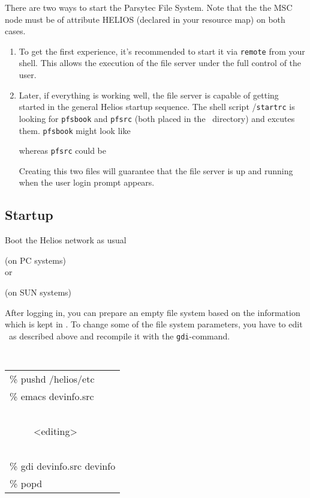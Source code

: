 \begin{note}
  There are two ways to start the Parsytec File System. Note that the the MSC
  node must be of attribute HELIOS (declared in your resource map) on both
  cases.

  \begin{enumerate}

    \item To get the first experience, it's recommended to start it via
          {\tt remote} from your shell. This allows the execution of the file
          server under the full control of the user.


    \item Later, if everything is working well, the file server is capable of
          getting started in the general Helios startup sequence. The shell
          script \HE\slash {\tt startrc} is looking for {\tt pfsbook} and
          {\tt pfsrc} (both placed in the \HE\ directory) and excutes them.
          {\tt pfsbook} might look like

          

          whereas {\tt pfsrc} could be

          

          Creating this two files will guarantee that the file server is up
          and running when the user login prompt appears.
  \end{enumerate}

\end{note}

\subsection{Startup}

Boot the Helios network as usual

 \hfill (on PC systems) \\

or

 \hfill (on SUN systems)

After logging in, you can prepare an empty file system based on the
information which is kept in \DI. To change some of the file system
parameters, you have to edit \DIS\ as described above and recompile it with
the {\tt gdi}-command.

{\tt
  \begin{tabular}{|l|}
    \hline
    \% pushd /helios/etc       \\
    \% emacs devinfo.src       \\
    \                          \\
    \ \ \ \ \ <editing>        \\
    \                          \\
    \% gdi devinfo.src devinfo \\
    \% popd                    \\
    \hline
  \end{tabular}
}

